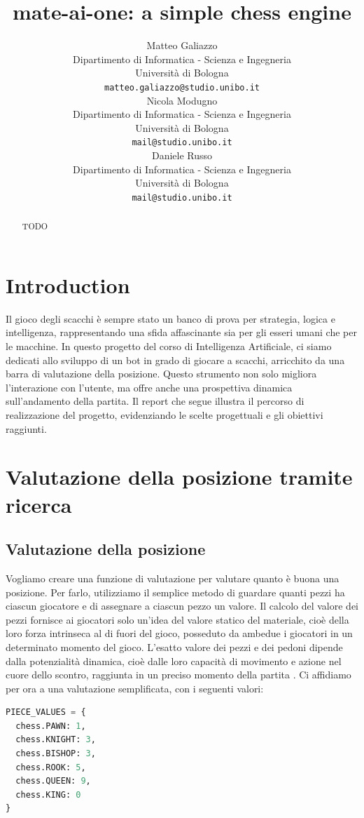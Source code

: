\documentclass{article}
\title{mate-ai-one: a simple chess engine}
\author{
 Matteo Galiazzo \\
  Dipartimento di Informatica - Scienza e Ingegneria\\
  Università di Bologna\\
  \texttt{matteo.galiazzo@studio.unibo.it} \\
   \And
 Nicola Modugno\\
  Dipartimento di Informatica - Scienza e Ingegneria\\
  Università di Bologna\\
  \texttt{mail@studio.unibo.it} \\
  \And
 Daniele Russo\\
  Dipartimento di Informatica - Scienza e Ingegneria\\
  Università di Bologna\\
  \texttt{mail@studio.unibo.it} \\
}
\begin{document}
\maketitle
\begin{abstract}
TODO
\end{abstract}


\section{Introduction}
Il gioco degli scacchi è sempre stato un banco di prova per strategia, logica e intelligenza, rappresentando una sfida affascinante sia per gli esseri umani che per le macchine.
In questo progetto del corso di Intelligenza Artificiale, ci siamo dedicati allo sviluppo di un bot in grado di giocare a scacchi, arricchito da una barra di valutazione della posizione.
Questo strumento non solo migliora l'interazione con l'utente, ma offre anche una prospettiva dinamica sull'andamento della partita.
Il report che segue illustra il percorso di realizzazione del progetto, evidenziando le scelte progettuali e gli obiettivi raggiunti.

\section{Valutazione della posizione tramite ricerca}

\subsection{Valutazione della posizione}

Vogliamo creare una funzione di valutazione per valutare quanto è buona una posizione.
Per farlo, utilizziamo il semplice metodo di guardare quanti pezzi ha ciascun giocatore e di assegnare a ciascun pezzo un valore.
Il calcolo del valore dei pezzi fornisce ai giocatori solo un'idea del valore statico del materiale, cioè della loro forza intrinseca al di fuori del gioco, posseduto da ambedue i giocatori in un determinato momento del gioco.
L'esatto valore dei pezzi e dei pedoni dipende dalla potenzialità dinamica, cioè dalle loro capacità di movimento e azione nel cuore dello scontro, raggiunta in un preciso momento della partita \cite{wikipediaChessPiece}.
Ci affidiamo per ora a una valutazione semplificata, con i seguenti valori:

\begin{lstlisting}[language=python]
PIECE_VALUES = {
  chess.PAWN: 1,
  chess.KNIGHT: 3,
  chess.BISHOP: 3,
  chess.ROOK: 5,
  chess.QUEEN: 9,
  chess.KING: 0
}
\end{lstlisting}
\end{document}
